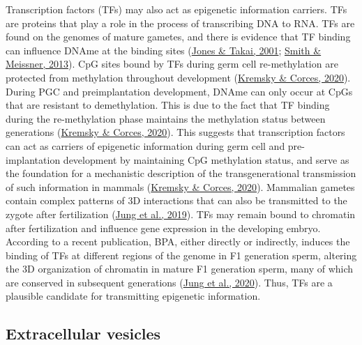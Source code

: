 \documentclass[12pt,twoside]{reedthesis}
\begin{document}
Transcription factors (TFs) may also act as epigenetic information
carriers. TFs are proteins that play a role in the
process of transcribing DNA to RNA. TFs are found on the genomes of
mature gametes, and there is evidence that TF binding can influence
DNAme at the binding sites (\protect\hyperlink{ref-jones2001}{Jones \& Takai, 2001}; \protect\hyperlink{ref-smith2013}{Smith \& Meissner, 2013}). CpG sites bound by
TFs during germ cell re-methylation are protected from methylation
throughout development (\protect\hyperlink{ref-kremsky2020}{Kremsky \& Corces, 2020}). During PGC and preimplantation
development, DNAme can only occur at CpGs that are resistant to
demethylation. This is due to the fact that TF binding during the
re-methylation phase maintains the methylation status between
generations (\protect\hyperlink{ref-kremsky2020}{Kremsky \& Corces, 2020}). This suggests that transcription factors can
act as carriers of epigenetic information during germ cell and
pre-implantation development by maintaining CpG methylation status, and
serve as the foundation for a mechanistic description of the
transgenerational transmission of such information in mammals
(\protect\hyperlink{ref-kremsky2020}{Kremsky \& Corces, 2020}). Mammalian gametes contain complex patterns of 3D
interactions that can also be transmitted to the zygote after
fertilization (\protect\hyperlink{ref-jung2019}{Jung et al., 2019}). TFs may remain bound to chromatin after
fertilization and influence gene expression in the developing embryo.
According to a recent publication, BPA, either directly or indirectly,
induces the binding of TFs at different regions of the genome in F1
generation sperm, altering the 3D organization of chromatin in mature F1
generation sperm, many of which are conserved in subsequent generations
(\protect\hyperlink{ref-jung2020}{Jung et al., 2020}). Thus, TFs are a plausible candidate for transmitting
epigenetic information.

\hypertarget{extracellular-vesicles}{%
\subsection*{Extracellular vesicles}\label{extracellular-vesicles}}
\end{document}
